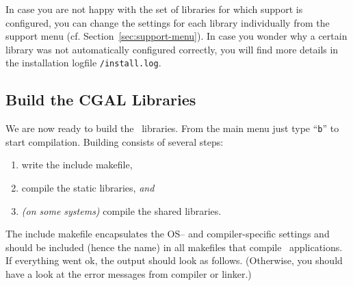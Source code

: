 In case you are not happy with the set of libraries for which support
is configured, you can change the settings for each library
individually from the support menu (cf.
Section~\ref{sec:support-menu}). In case you wonder why a certain
library was not automatically configured correctly, you will find more
details in the installation logfile \texttt{\cgaldir/install.log}.

\subsection{Build the CGAL Libraries\label{sec:build-the-libs}}

We are now ready to build the \cgal\ libraries. From the main menu
just type ``{\tt b}'' to start compilation. Building consists of
several steps:
\begin{enumerate}
\item write the include makefile,
\item compile the static libraries, \textit{and}
\item \textit{(on some systems)} compile the shared libraries.
\end{enumerate}
The include makefile encapsulates the OS-- and
compiler-specific settings and should be included (hence the name) in
all makefiles that compile \cgal\ applications. If everything went ok,
the output should look as follows. (Otherwise, you should have a look
at the error messages from compiler or linker.)

